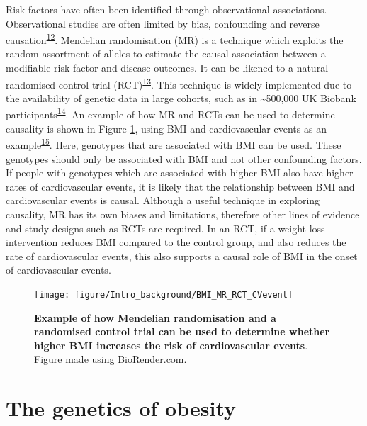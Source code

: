 \documentclass[11pt,twoside]{bristolthesis}
\begin{document}
Risk factors have often been identified through observational associations. Observational studies are often limited by bias, confounding and reverse causation\textsuperscript{\protect\hyperlink{ref-Davies2018}{12}}. Mendelian randomisation (MR) is a technique which exploits the random assortment of alleles to estimate the causal association between a modifiable risk factor and disease outcomes. It can be likened to a natural randomised control trial (RCT)\textsuperscript{\protect\hyperlink{ref-Gill2020}{13}}. This technique is widely implemented due to the availability of genetic data in large cohorts, such as in \textasciitilde500,000 UK Biobank participants\textsuperscript{\protect\hyperlink{ref-Bycroft2018}{14}}. An example of how MR and RCTs can be used to determine causality is shown in Figure \ref{fig:MR-CVevent}, using BMI and cardiovascular events as an example\textsuperscript{\protect\hyperlink{ref-Doney2009}{15}}. Here, genotypes that are associated with BMI can be used. These genotypes should only be associated with BMI and not other confounding factors. If people with genotypes which are associated with higher BMI also have higher rates of cardiovascular events, it is likely that the relationship between BMI and cardiovascular events is causal. Although a useful technique in exploring causality, MR has its own biases and limitations, therefore other lines of evidence and study designs such as RCTs are required. In an RCT, if a weight loss intervention reduces BMI compared to the control group, and also reduces the rate of cardiovascular events, this also supports a causal role of BMI in the onset of cardiovascular events.



\begin{figure}
\texttt{[image: figure/Intro\_background/BMI\_MR\_RCT\_CVevent]} \caption[Mendelian randomisation and randomised control trial example using body mass index and cardiovascular events]{\textbf{Example of how Mendelian randomisation and a randomised control trial can be used to determine whether higher BMI increases the risk of cardiovascular events}. Figure made using BioRender.com.}\label{fig:MR-CVevent}
\end{figure}
\hypertarget{the-genetics-of-obesity}{%
\section{The genetics of obesity}\label{the-genetics-of-obesity}}
\end{document}
